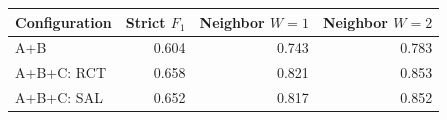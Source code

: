 \begin{tabular}{@{}lrrr@{}}
\toprule
Configuration & Strict $F_1$ & Neighbor $W=1$ & Neighbor $W=2$ \\
\midrule
A+B & 0.604 & 0.743 & 0.783 \\
A+B+C: RCT & 0.658 & 0.821 & 0.853 \\
A+B+C: SAL & 0.652 & 0.817 & 0.852 \\
\bottomrule
\end{tabular}
